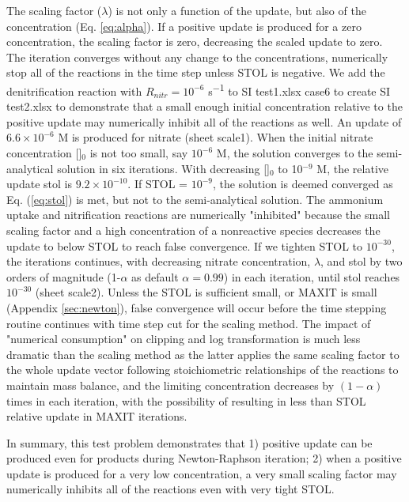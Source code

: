 \documentclass[gmd, manuscript]{copernicus}
\begin{document}
The scaling factor ($\lambda$) is not only a function of the update, but also of the  concentration (Eq. \ref{eq:alpha}). If a positive update is produced for a zero concentration, the scaling factor is zero, decreasing the scaled update to zero. The iteration converges without any change to the concentrations, numerically stop all of the reactions in the time step unless STOL is negative. We add  the denitrification reaction with $R_{nitr} = 10^{-6}$ \unit{s^{-1}} to SI
test1.xlsx case6 to create SI test2.xlsx to demonstrate that a small enough initial concentration relative to the positive update may numerically inhibit all of the reactions as well.
An update of $6.6 \times 10^{-6}$ \unit{M} is produced for nitrate
(sheet scale1). When the initial nitrate concentration []$_0$
is not too small, say $10^{-6}$ \unit{M}, the solution converges to the semi-analytical
solution in six iterations. With decreasing []$_0$ to 10$^{-9}$
\unit{M}, the relative update stol 
is $9.2\times 10^{-10}$. If STOL = $10^{-9}$, the solution is deemed converged as Eq.
(\ref{eq:stol}) is met, but not to the semi-analytical solution. The ammonium
uptake and nitrification reactions are numerically "inhibited" because the small scaling factor and a high concentration of a nonreactive species decreases the update to
below STOL to reach false convergence. If we tighten STOL to $10^{-30}$, the iterations continues, with decreasing nitrate concentration, $\lambda$, and stol by two orders of magnitude (1-$\alpha$ as default $\alpha=0.99$) in each iteration, until stol reaches $10^{-30}$ (sheet scale2). Unless the STOL is sufficient small, or MAXIT is small (Appendix \ref{sec:newton}), false convergence will occur before the time stepping routine continues with time step cut for the scaling method. The impact of "numerical consumption" on clipping and log transformation is much less dramatic than the scaling method as the latter applies the same scaling factor to the whole update vector following stoichiometric relationships of the reactions to maintain mass balance, and the limiting concentration decreases by $(1-\alpha)$ times in each iteration, with the possibility of resulting in less than STOL relative update in MAXIT iterations.  

In summary, this test problem demonstrates that 1) positive update can be produced even for products during Newton-Raphson iteration; 2) when a positive update is produced for a very low concentration, a very small scaling factor may numerically inhibits all of the reactions even with very tight STOL.
\end{document}
